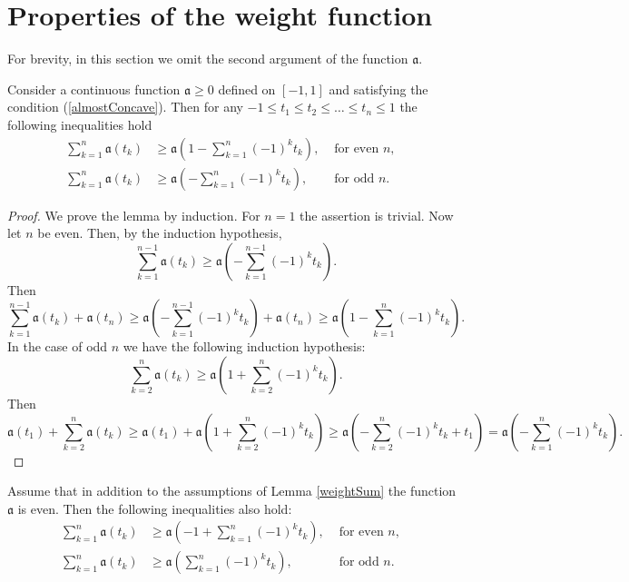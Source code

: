 \section{Properties of the weight function}

For brevity, in this section we omit the second argument of the function $\mathfrak a$.

\begin{lm}
\label{weightSum}
Consider a continuous function $\mathfrak a \ge 0$ defined on $[-1, 1]$
and satisfying the condition (\ref{almostConcave}).
Then for any $-1 \le t_1 \le t_2 \le \ldots \le t_n \le 1$
the following inequalities hold
\begin{align*}
\sum_{k = 1}^n \mathfrak a(t_k) & \ge \mathfrak a( 1 - \sum_{k = 1}^n (-1)^k t_k), & \text{ for even $n$}, & \\
\sum_{k = 1}^n \mathfrak a(t_k) & \ge \mathfrak a(- \sum_{k = 1}^n (-1)^k t_k), & \text{ for odd $n$}. &
\end{align*}
\end{lm}

\begin{proof}
We prove the lemma by induction.
For $n = 1$ the assertion is trivial.
Now let $n$ be even. Then, by the induction hypothesis,
$$\sum_{k=1}^{n - 1} \mathfrak a(t_k) \ge \mathfrak a( -\sum_{k = 1}^{n - 1} (-1)^k t_k ).$$
Then
$$\sum_{k = 1}^{n - 1} \mathfrak a( t_k ) + \mathfrak a( t_n ) \ge \mathfrak a( -\sum_{k = 1}^{n - 1} (-1)^k t_k ) + \mathfrak a( t_n ) \ge
\mathfrak a( 1 - \sum_{k = 1}^{n} (-1)^k t_k ).$$
In the case of odd $n$ we have the following induction hypothesis:
$$\sum_{k=2}^n \mathfrak a(t_k) \ge \mathfrak a( 1 + \sum_{k = 2}^n (-1)^k t_k ).$$
Then
$$\mathfrak a( t_1 ) + \sum_{k = 2}^n \mathfrak a( t_k ) \ge \mathfrak a( t_1 ) + \mathfrak a( 1 + \sum_{k = 2}^{n} (-1)^k t_k ) \ge
\mathfrak a( -\sum_{k = 2}^{n} (-1)^k t_k + t_1 ) = \mathfrak a( -\sum_{k = 1}^{n} (-1)^k t_k ).$$
\end{proof}

\begin{rem}
Assume that in addition to the assumptions of Lemma \ref{weightSum} the function $\mathfrak a$ is even.
Then the following inequalities also hold:
\label{almostConcaveMultRem}
\begin{align*}
\sum_{k = 1}^n \mathfrak a(t_k) & \ge \mathfrak a(-1 + \sum_{k = 1}^n (-1)^k t_k), & \text{ for even $n$}, & \\
\sum_{k = 1}^n \mathfrak a(t_k) & \ge \mathfrak a(\sum_{k = 1}^n (-1)^k t_k), & \text{ for odd $n$}. &
\end{align*}
\end{rem}

